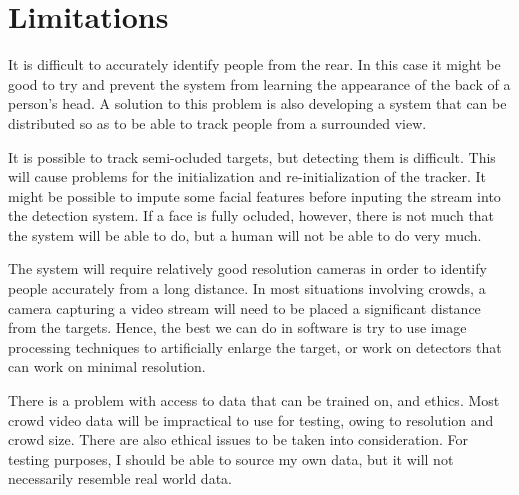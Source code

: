 \section{Limitations}
  It is difficult to accurately identify people from the rear.
  In this case it might be good to try and prevent the system from learning the appearance of the back of a person's head.
  A solution to this problem is also developing a system that can be distributed so as to be able to track people from a surrounded view.

  It is possible to track semi-ocluded targets, but detecting them is difficult.
  This will cause problems for the initialization and re-initialization of the tracker.
  It might be possible to impute some facial features before inputing the stream into the detection system.
  If a face is fully ocluded, however, there is not much that the system will be able to do, but a human will not be able to do very much.

  The system will require relatively good resolution cameras in order to identify people accurately from a long distance.
  In most situations involving crowds, a camera capturing a video stream will need to be placed a significant distance from the targets.
  Hence, the best we can do in software is try to use image processing techniques to artificially enlarge the target, or work on detectors that can work on minimal resolution.

  There is a problem with access to data that can be trained on, and ethics.
  Most crowd video data will be impractical to use for testing, owing to resolution and crowd size.
  There are also ethical issues to be taken into consideration.
  For testing purposes, I should be able to source my own data, but it will not necessarily resemble real world data.
